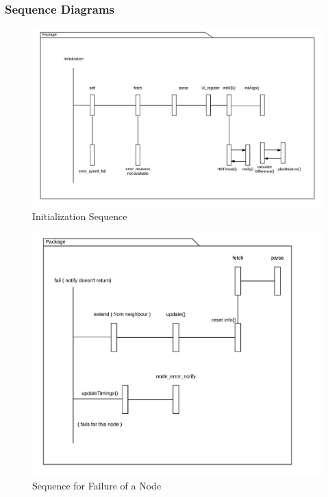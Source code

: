 \documentclass[12pt,a4paper,final]{report}
\begin{document}
\subsubsection{Sequence Diagrams}
	\begin{figure}[!h]
		\begin{center}
			\includegraphics[scale=0.6]{Diagrams/First_Sequence.jpeg}
		\end{center}
		\caption{Initialization Sequence}
	\end{figure}
	\begin{figure}[!h]
		\begin{center}
			\includegraphics[scale=0.6]{Diagrams/Error_Sequence.jpeg}
		\end{center}
		\caption{Sequence for Failure of a Node}
	\end{figure}
\end{document}
